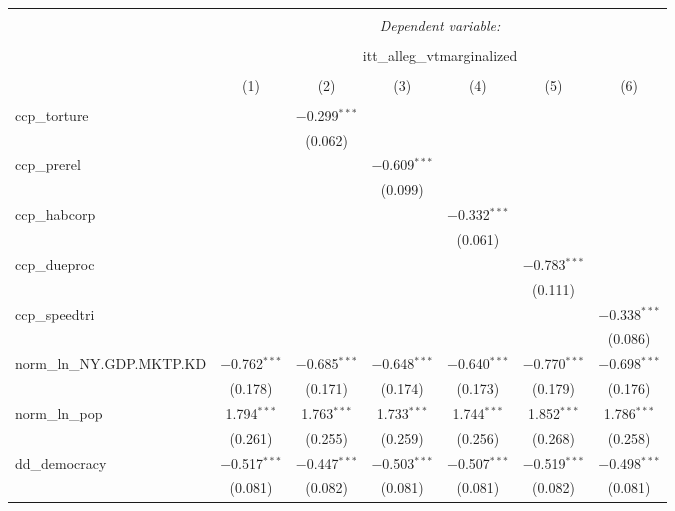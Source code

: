
\begin{sidewaystable}[!htbp] \centering 
  \caption{} 
  \label{} 
\tiny 
\begin{tabular}{@{\extracolsep{5pt}}lcccccc} 
\\[-1.8ex]\hline 
\hline \\[-1.8ex] 
 & \multicolumn{6}{c}{\textit{Dependent variable:}} \\ 
\cline{2-7} 
\\[-1.8ex] & \multicolumn{6}{c}{itt\_alleg\_vtmarginalized} \\ 
\\[-1.8ex] & (1) & (2) & (3) & (4) & (5) & (6)\\ 
\hline \\[-1.8ex] 
 ccp\_torture &  & $-$0.299$^{***}$ &  &  &  &  \\ 
  &  & (0.062) &  &  &  &  \\ 
  ccp\_prerel &  &  & $-$0.609$^{***}$ &  &  &  \\ 
  &  &  & (0.099) &  &  &  \\ 
  ccp\_habcorp &  &  &  & $-$0.332$^{***}$ &  &  \\ 
  &  &  &  & (0.061) &  &  \\ 
  ccp\_dueproc &  &  &  &  & $-$0.783$^{***}$ &  \\ 
  &  &  &  &  & (0.111) &  \\ 
  ccp\_speedtri &  &  &  &  &  & $-$0.338$^{***}$ \\ 
  &  &  &  &  &  & (0.086) \\ 
  norm\_ln\_NY.GDP.MKTP.KD & $-$0.762$^{***}$ & $-$0.685$^{***}$ & $-$0.648$^{***}$ & $-$0.640$^{***}$ & $-$0.770$^{***}$ & $-$0.698$^{***}$ \\ 
  & (0.178) & (0.171) & (0.174) & (0.173) & (0.179) & (0.176) \\ 
  norm\_ln\_pop & 1.794$^{***}$ & 1.763$^{***}$ & 1.733$^{***}$ & 1.744$^{***}$ & 1.852$^{***}$ & 1.786$^{***}$ \\ 
  & (0.261) & (0.255) & (0.259) & (0.256) & (0.268) & (0.258) \\ 
  dd\_democracy & $-$0.517$^{***}$ & $-$0.447$^{***}$ & $-$0.503$^{***}$ & $-$0.507$^{***}$ & $-$0.519$^{***}$ & $-$0.498$^{***}$ \\ 
  & (0.081) & (0.082) & (0.081) & (0.081) & (0.082) & (0.081) \\ 

\end{tabular}
\end{sidewaystable}
